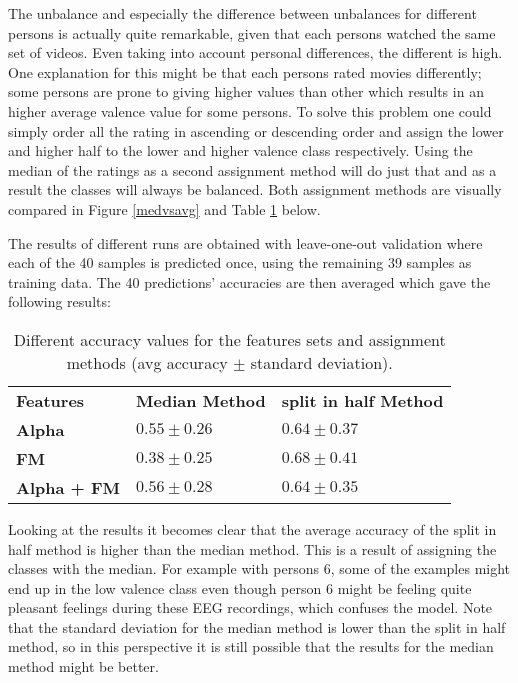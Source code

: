 The unbalance and especially the difference between unbalances for different persons is actually quite remarkable, given that each persons watched the same set of videos. Even taking into account personal differences, the different is high. One explanation for this might be that each persons rated movies differently; some persons are prone to giving higher values than other which results in an higher average valence value for some persons. To solve this problem one could simply order all the rating in ascending or descending order and assign the lower and higher half to the lower and higher valence class respectively. Using the median of the ratings as a second assignment method will do just that and as a result the classes will always be balanced. Both assignment methods are visually compared in Figure \ref{medvsavg} and Table \ref{firstrestable} below.


\clearpage

The results of different runs are obtained with leave-one-out validation where each of the 40 samples is predicted once, using the remaining 39 samples as training data. The 40 predictions' accuracies are then averaged which gave the following results:


\begin{table}[H]
\centering
\begin{tabular}{lll}
\textbf{Features} & \textbf{Median Method} & \textbf{split in half Method} \\
\textbf{Alpha}             & $0.55 \pm 0.26$   & $0.64 \pm 0.37$     \\
\textbf{FM}                & $0.38 \pm 0.25$   & $0.68 \pm 0.41$    \\
\textbf{Alpha + FM}        & $0.56 \pm 0.28$   & $0.64 \pm 0.35$   
\end{tabular}
\caption{Different accuracy values for the features sets and assignment methods (avg accuracy $\pm$ standard deviation).}
\label{firstrestable}
\end{table}

Looking at the results it becomes clear that the average accuracy of the split in half method is higher than the median method. This is a result of assigning the classes with the median. For example with persons 6, some of the examples might end up in the low valence class even though person 6 might be feeling quite pleasant feelings during these EEG recordings, which confuses the model. 
Note that the standard deviation for the median method is lower than the split in half method, so in this perspective it is still possible that the results for the median method might be better. 

